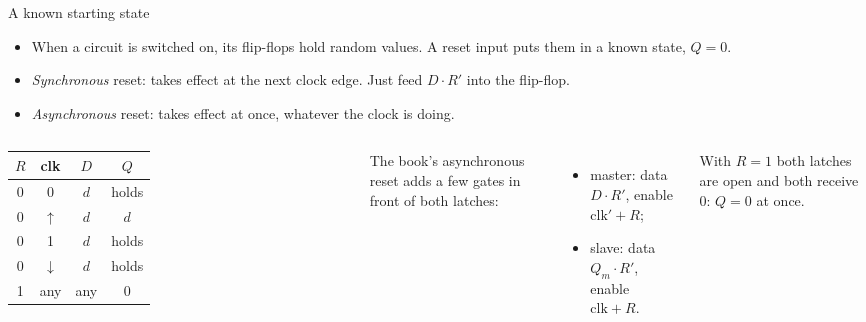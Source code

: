 \documentclass[10pt]{wosm-slides}
\begin{document}
\begin{frame}{A known starting state}
  \begin{itemize}
    \item When a circuit is switched on, its flip-flops hold random values. A
      \alert{reset} input puts them in a known state, $Q = 0$.
    \item \emph{Synchronous} reset: takes effect at the next clock edge. Just feed
      $D \cdot R'$ into the flip-flop.
    \item \emph{Asynchronous} reset: takes effect at once, whatever the clock is
      doing.
  \end{itemize}

  \medskip
  \begin{columns}[c, totalwidth=\textwidth]
      \centering
      \small
      \begin{tabular}{@{}ccc|c@{}}
        $R$ & clk & $D$ & $Q$ \\
        \midrule
        0 & 0 & $d$ & holds \\
        0 & $\uparrow$ & $d$ & $d$ \\
        0 & 1 & $d$ & holds \\
        0 & $\downarrow$ & $d$ & holds \\
        1 & any & any & 0 \\
      \end{tabular}
      \small
      The book's asynchronous reset adds a few gates in front of both latches:
      \begin{itemize}
        \item master: data $D \cdot R'$, enable $\mathrm{clk}' + R$;
        \item slave: data $Q_m \cdot R'$, enable $\mathrm{clk} + R$.
      \end{itemize}
      With $R = 1$ both latches are open and both receive 0: $Q = 0$ at once.
  \end{columns}
\end{frame}
\end{document}
